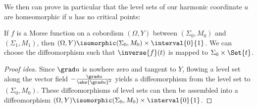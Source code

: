 \documentclass[titlepage,numbers=noenddot,oneside,%
cleardoublepage=empty,paper=a4,fontsize=11pt,%
english,%
]{scrartcl}
\begin{document}
We then can prove in particular that the level sets of our harmonic coordinate \( u \) are homeomorphic if \( u \) has no critical points: 
\begin{lemma}\label{lem:morse_function_without_critical_points_level_sets_diffeo}
    If \( f \) is a Morse function on a cobordism \( (\Omega,Y) \) between \( (\Sigma_0,M_0) \) and \( (\Sigma_1,M_1) \), then \( (\Omega,Y)\isomorphic (\Sigma_0,M_0)\times \interval{0}{1} \). We can choose the diffeomorphism such that \( \inverse{f}(t) \) is mapped to \( \Sigma_0\times \Set{t} \).
\end{lemma}
\begin{proof}[Proof idea]
    Since \( \grad u \) is nowhere zero and tangent to \( Y \), flowing a level set along the vector field \( -\frac{\grad u}{\abs{\grad u}^2} \) yields a diffeomorphism from the level set to \( (\Sigma_0,M_0) \). These diffeomorphisms of level sets can then be assembled into a diffeomorphism \( (\Omega,Y)\isomorphic (\Sigma_0,M_0)\times \interval{0}{1}  \).
\end{proof}
% 
\printbibliography
\end{document}
